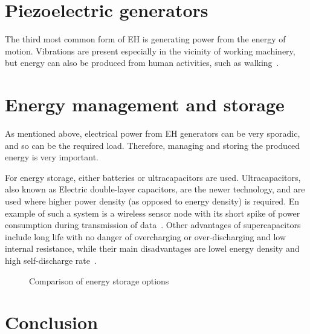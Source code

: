 \documentclass[a4paper,10pt]{article}
\begin{document}
\section{Piezoelectric generators}

The third most common form of \ac{EH} is generating power from the energy of motion. Vibrations are present especially in the vicinity of working machinery, but energy can also be produced from human activities, such as walking~\cite{piezo-shoe-ieee}. 

\section{Energy management and storage}

As mentioned above, electrical power from \ac{EH} generators can be very sporadic, and so can be the required load. Therefore, managing and storing the produced energy is very important. 

For energy storage, either batteries or ultracapacitors are used. Ultracapacitors, also known as Electric double-layer capacitors, are the newer technology, and are used where higher power density (as opposed to energy density) is required. En example of such a system is a wireless sensor node with its short spike of power consumption during transmission of data~\cite{cap-wsn-ieee}. Other advantages of supercapacitors include long life with no danger of overcharging or over-discharging and low internal resistance, while their main disadvantages are lowel energy density and high self-discharge rate~\cite{wiki:edlc}. 

\begin{figure}
\def\svgwidth{\textwidth}
 
\caption{Comparison of energy storage options~\cite{wiki:edlc}}
\label{fig:storage-chart}
\end{figure}


\section{Conclusion}


 
\end{document}
